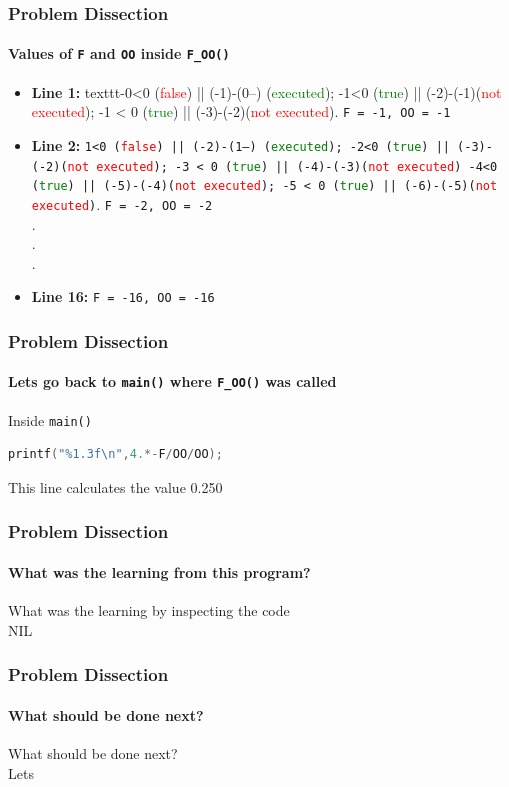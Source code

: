 \documentclass[12pt]{beamer}
\begin{document}
\begin{frame}[fragile]
	\frametitle{Problem Dissection}
	\framesubtitle{Values of \texttt{F} and \texttt{OO} inside \texttt{F\_OO()}}
	\begin{itemize}
	\item  {\tiny \textbf{Line 1:} texttt{-0<0 (\textcolor{red}{false}) || (-1)-(0--) (\textcolor{green}{executed}); -1<0 (\textcolor{green}{true}) || (-2)-(-1)(\textcolor{red}{not executed}); -1 < 0 (\textcolor{green}{true}) || (-3)-(-2)(\textcolor{red}{not executed})}}. {\tiny \texttt{F = -1, OO = -1}}
	\item {\tiny \textbf{Line 2:} \texttt{1<0 (\textcolor{red}{false}) || (-2)-(1--) (\textcolor{green}{executed}); -2<0 (\textcolor{green}{true}) || (-3)-(-2)(\textcolor{red}{not executed}); -3 < 0 (\textcolor{green}{true}) || (-4)-(-3)(\textcolor{red}{not executed}) -4<0 (\textcolor{green}{true}) || (-5)-(-4)(\textcolor{red}{not executed}); -5 < 0 (\textcolor{green}{true}) || (-6)-(-5)(\textcolor{red}{not executed})}}. {\tiny \texttt{F = -2, OO = -2}}
	\\.
	\\.
	\\.
	\item {\tiny \textbf{Line 16:} \texttt{F = -16, OO = -16} }
	\end{itemize}
\end{frame}

\begin{frame}[fragile]
	\frametitle{Problem Dissection}
	\framesubtitle{Lets go back to \texttt{main()} where \texttt{F\_OO()} was called}
	\begin{block}{Inside \texttt{main()}}
		\begin{lstlisting}[language=C]
			printf("%1.3f\n",4.*-F/OO/OO);
		\end{lstlisting}
		This line calculates the value 0.250 
	\end{block}
\end{frame}

\begin{frame}
	\frametitle{Problem Dissection}
	\framesubtitle{What was the learning from this program?}
	\begin{center}
		\small {What was the learning by inspecting the code} \\
		\huge {NIL}
	\end{center}
\end{frame}

\begin{frame}
	\frametitle{Problem Dissection}
	\framesubtitle{What should be done next?}
	\begin{center}
		\small {What should be done next?} \\
		\small {Lets} \\
	\end{center}
\end{frame}
\end{document}
